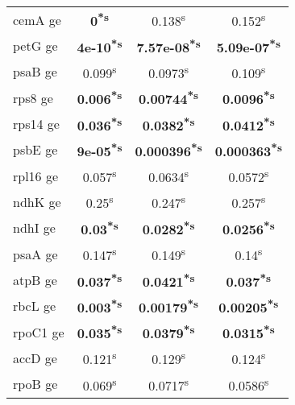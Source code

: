 \documentclass[a4paper]{article}
\begin{document}
\begin{longtable}{l|c|c|c}
cemA ge&\textbf{0\textsuperscript{*}\textsuperscript{s}}&0.138\textsuperscript{s}&0.152\textsuperscript{s}\\
petG ge&\textbf{4e-10\textsuperscript{*}\textsuperscript{s}}&\textbf{7.57e-08\textsuperscript{*}\textsuperscript{s}}&\textbf{5.09e-07\textsuperscript{*}\textsuperscript{s}}\\
psaB ge&0.099\textsuperscript{s}&0.0973\textsuperscript{s}&0.109\textsuperscript{s}\\
rps8 ge&\textbf{0.006\textsuperscript{*}\textsuperscript{s}}&\textbf{0.00744\textsuperscript{*}\textsuperscript{s}}&\textbf{0.0096\textsuperscript{*}\textsuperscript{s}}\\
rps14 ge&\textbf{0.036\textsuperscript{*}\textsuperscript{s}}&\textbf{0.0382\textsuperscript{*}\textsuperscript{s}}&\textbf{0.0412\textsuperscript{*}\textsuperscript{s}}\\
psbE ge&\textbf{9e-05\textsuperscript{*}\textsuperscript{s}}&\textbf{0.000396\textsuperscript{*}\textsuperscript{s}}&\textbf{0.000363\textsuperscript{*}\textsuperscript{s}}\\
rpl16 ge&0.057\textsuperscript{s}&0.0634\textsuperscript{s}&0.0572\textsuperscript{s}\\
ndhK ge&0.25\textsuperscript{s}&0.247\textsuperscript{s}&0.257\textsuperscript{s}\\
ndhI ge&\textbf{0.03\textsuperscript{*}\textsuperscript{s}}&\textbf{0.0282\textsuperscript{*}\textsuperscript{s}}&\textbf{0.0256\textsuperscript{*}\textsuperscript{s}}\\
psaA ge&0.147\textsuperscript{s}&0.149\textsuperscript{s}&0.14\textsuperscript{s}\\
atpB ge&\textbf{0.037\textsuperscript{*}\textsuperscript{s}}&\textbf{0.0421\textsuperscript{*}\textsuperscript{s}}&\textbf{0.037\textsuperscript{*}\textsuperscript{s}}\\
rbcL ge&\textbf{0.003\textsuperscript{*}\textsuperscript{s}}&\textbf{0.00179\textsuperscript{*}\textsuperscript{s}}&\textbf{0.00205\textsuperscript{*}\textsuperscript{s}}\\
rpoC1 ge&\textbf{0.035\textsuperscript{*}\textsuperscript{s}}&\textbf{0.0379\textsuperscript{*}\textsuperscript{s}}&\textbf{0.0315\textsuperscript{*}\textsuperscript{s}}\\
accD ge&0.121\textsuperscript{s}&0.129\textsuperscript{s}&0.124\textsuperscript{s}\\
rpoB ge&0.069\textsuperscript{s}&0.0717\textsuperscript{s}&0.0586\textsuperscript{s}\\

\end{longtable}
\end{document}
